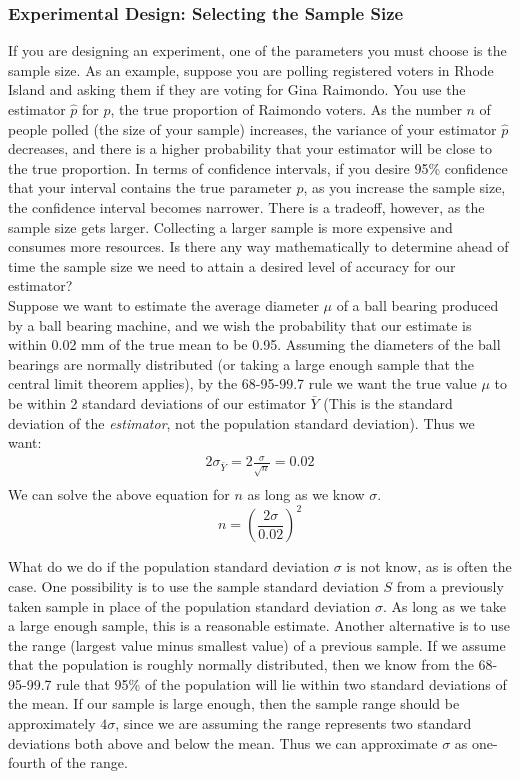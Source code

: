 \documentclass[12pt]{article}
\theoremstyle{definition}
\theoremstyle{remark}
\begin{document}
\subsubsection{Experimental Design: Selecting the Sample Size}
If you are designing an experiment, one of the parameters you must choose is the sample size. As an example, suppose you are polling registered voters in Rhode Island and asking them if they are voting for Gina Raimondo. You use the estimator $\hat{p}$ for $p$, the true proportion of Raimondo voters. As the number $n$ of people polled (the size of your sample) increases, the variance of your estimator $\hat{p}$ decreases, and there is a higher probability that your estimator will be close to the true proportion. In terms of confidence intervals, if you desire 95\% confidence that your interval contains the true parameter $p$, as you increase the sample size, the confidence interval becomes narrower. There is a tradeoff, however, as the sample size gets larger. Collecting a larger sample is more expensive and consumes more resources. Is there any way mathematically to determine ahead of time the sample size we need to attain a desired level of accuracy for our estimator?\\

Suppose we want to estimate the average diameter $\mu$ of a ball bearing produced by a ball bearing machine, and we wish the probability that our estimate is within 0.02 mm of the true mean to be 0.95. Assuming the diameters of the ball bearings are normally distributed (or taking a large enough sample that the central limit theorem applies), by the 68-95-99.7 rule we want the true value $\mu$ to be within 2 standard deviations of our estimator $\bar{Y}$ (This is the standard deviation of the \emph{estimator}, not the population standard deviation). Thus we want:
\begin{align*}
2 \sigma_{\bar{Y}} = 2 \frac{\sigma}{\sqrt{n}} = 0.02 \\
\end{align*}
We can solve the above equation for $n$ as long as we know $\sigma$.
\[
n = \left( \frac{2 \sigma}{0.02}\right)^2
\]

What do we do if the population standard deviation $\sigma$ is not know, as is often the case. One possibility is to use the sample standard deviation $S$ from a previously taken sample in place of the population standard deviation $\sigma$. As long as we take a large enough sample, this is a reasonable estimate. Another alternative is to use the range (largest value minus smallest value) of a previous sample. If we assume that the population is roughly normally distributed, then we know from the 68-95-99.7 rule that 95\% of the population will lie within two standard deviations of the mean. If our sample is large enough, then the sample range should be approximately $4\sigma$, since we are assuming the range represents two standard deviations both above and below the mean. Thus we can approximate $\sigma$ as one-fourth of the range.\\
\end{document}

